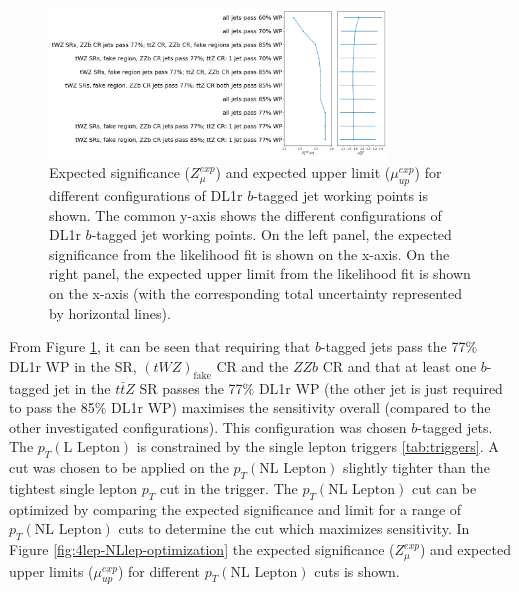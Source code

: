 \begin{figure}[h!]
	\includegraphics[width = 0.8\textwidth]{figures/btagWP_optimization.png}
  \centering
	\caption{Expected significance ($Z_{\mu}^{exp}$) and expected upper limit ($\mu_{up}^{exp}$) for different configurations of DL1r $b$-tagged jet working points is shown. The common y-axis shows the different configurations of DL1r $b$-tagged jet working points. On the left panel, the expected significance from the likelihood fit is shown on the x-axis. On the right panel, the expected upper limit from the likelihood fit is shown on the x-axis (with the corresponding total uncertainty represented by horizontal lines).}
	\label{fig:4lep-btagWP-optimization}
\end{figure}From Figure \ref{fig:4lep-btagWP-optimization}, it can be seen that requiring that $b$-tagged jets pass the 77$\%$ DL1r WP in the \tWZ SR, $(tWZ)_{\text{fake}}$ CR and the $ZZb$ CR and that at least one $b$-tagged jet in the $t\bar{t}Z$ SR passes the 77$\%$ DL1r WP (the other jet is just required to pass the 85$\%$ DL1r WP) maximises the sensitivity overall (compared to the other investigated configurations). This configuration was chosen $b$-tagged jets. The $p_{T}(\text{L Lepton})$ is constrained by the single lepton triggers \ref{tab:triggers}. A cut was chosen to be applied on the $p_{T}(\text{NL Lepton})$ slightly tighter than the tightest single lepton $p_{T}$ cut in the trigger. The $p_{T}(\text{NL Lepton})$ cut can be optimized by comparing the expected significance and limit for a range of $p_{T}{(\text{NL Lepton})}$ cuts to determine the cut which maximizes sensitivity. In Figure \ref{fig:4lep-NLlep-optimization} the expected significance ($Z_{\mu}^{exp}$) and expected upper limits ($\mu_{up}^{exp}$) for different $p_{T}(\text{NL Lepton})$ cuts is shown.
